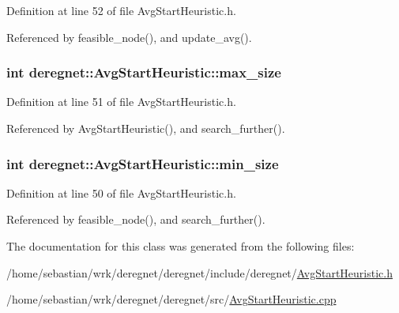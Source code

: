 Definition at line 52 of file Avg\+Start\+Heuristic.\+h.



Referenced by feasible\+\_\+node(), and update\+\_\+avg().

\subsubsection[{\texorpdfstring{max\+\_\+size}{max_size}}]{\setlength{\rightskip}{0pt plus 5cm}int deregnet\+::\+Avg\+Start\+Heuristic\+::max\+\_\+size\hspace{0.3cm}{\ttfamily [private]}}\hypertarget{classderegnet_1_1AvgStartHeuristic_a4794e58ea33d94f9029defa3a31cc573}{}\label{classderegnet_1_1AvgStartHeuristic_a4794e58ea33d94f9029defa3a31cc573}


Definition at line 51 of file Avg\+Start\+Heuristic.\+h.



Referenced by Avg\+Start\+Heuristic(), and search\+\_\+further().

\subsubsection[{\texorpdfstring{min\+\_\+size}{min_size}}]{\setlength{\rightskip}{0pt plus 5cm}int deregnet\+::\+Avg\+Start\+Heuristic\+::min\+\_\+size\hspace{0.3cm}{\ttfamily [private]}}\hypertarget{classderegnet_1_1AvgStartHeuristic_a3abc4d801d4eb1fdb8ecfed7077045b3}{}\label{classderegnet_1_1AvgStartHeuristic_a3abc4d801d4eb1fdb8ecfed7077045b3}


Definition at line 50 of file Avg\+Start\+Heuristic.\+h.



Referenced by feasible\+\_\+node(), and search\+\_\+further().



The documentation for this class was generated from the following files\+:\begin{DoxyCompactItemize}
\item 
/home/sebastian/wrk/deregnet/deregnet/include/deregnet/\hyperlink{AvgStartHeuristic_8h}{Avg\+Start\+Heuristic.\+h}\item 
/home/sebastian/wrk/deregnet/deregnet/src/\hyperlink{AvgStartHeuristic_8cpp}{Avg\+Start\+Heuristic.\+cpp}\end{DoxyCompactItemize}
